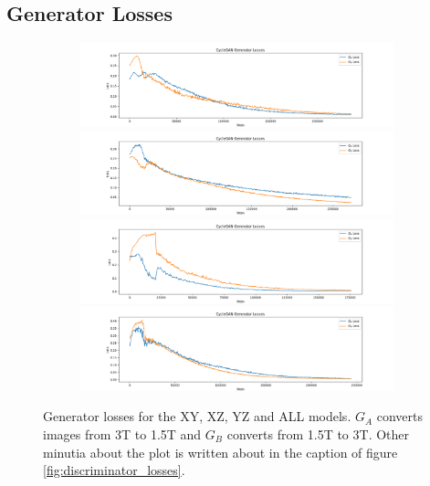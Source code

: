 \documentclass[11pt, fleqn, titlepage]{article}
\newcommand{\1}[1]{\mathds{1}\left[#1\right]}
\begin{document}
\subsection{Generator Losses}\label{gen_loss}
\begin{figure}[H]
	\centering
	\begin{subfigure}[b]{0.8\textwidth}
		\centering
		\includegraphics[width=\linewidth]{imgs/generator_losses/XY_model_generator_losses}
		\hfill
		\includegraphics[width=\linewidth]{imgs/generator_losses/XZ_model_generator_losses}
		\hfill
		\includegraphics[width=\linewidth]{imgs/generator_losses/YZ_model_generator_losses}
		\hfill
		\includegraphics[width=\linewidth]{imgs/generator_losses/ALL_model_generator_losses}
	\end{subfigure}
	\caption{Generator losses for the XY, XZ, YZ and ALL models. $G_A$ converts images from 3T to 1.5T and $G_B$ converts from 1.5T to 3T. Other minutia about the plot is written about in the caption of figure \ref{fig:discriminator_losses}.}
	\label{fig:generator_losses}
\end{figure}
\end{document}
